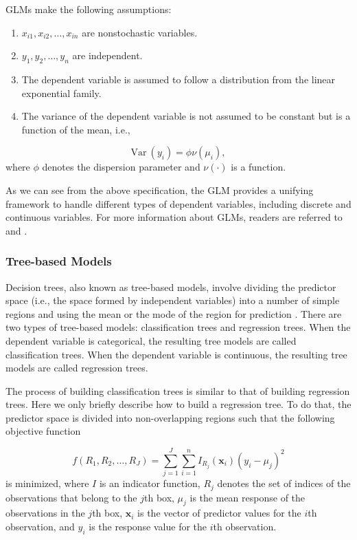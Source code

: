 \documentclass[]{book}
\theoremstyle{definition}
\theoremstyle{definition}
\theoremstyle{definition}
\theoremstyle{remark}
\begin{document}
GLMs make the following assumptions:

\begin{enumerate}
\def\labelenumi{(\alph{enumi})}
\item
  \(x_{i1},x_{i2},\ldots,x_{in}\) are nonstochastic variables.
\item
  \(y_1,y_2,\ldots,y_n\) are independent.
\item
  The dependent variable is assumed to follow a distribution from the
  linear exponential family.
\item
  The variance of the dependent variable is not assumed to be constant
  but is a function of the mean, i.e.,
\end{enumerate}

\[\mathrm{Var~}{(y_i)} = \phi \nu(\mu_i),\] where \(\phi\) denotes the
dispersion parameter and \(\nu(\cdot)\) is a function.

As we can see from the above specification, the GLM provides a unifying
framework to handle different types of dependent variables, including
discrete and continuous variables. For more information about GLMs,
readers are referred to \citep{dejong2008} and \citep{frees2009}.

\subsubsection{Tree-based Models}\label{tree-based-models}

Decision trees, also known as tree-based models, involve dividing the
predictor space (i.e., the space formed by independent variables) into a
number of simple regions and using the mean or the mode of the region
for prediction \citep{breiman1984}. There are two types of tree-based
models: classification trees and regression trees. When the dependent
variable is categorical, the resulting tree models are called
classification trees. When the dependent variable is continuous, the
resulting tree models are called regression trees.

The process of building classification trees is similar to that of
building regression trees. Here we only briefly describe how to build a
regression tree. To do that, the predictor space is divided into
non-overlapping regions such that the following objective function

\[f(R_1,R_2,\ldots,R_J) = \sum_{j=1}^J \sum_{i=1}^n I_{R_j}(\textbf{x}_i)(y_i - \mu_j)^2\]
is minimized, where \(I\) is an indicator function, \(R_j\) denotes the
set of indices of the observations that belong to the \(j\)th box,
\(\mu_j\) is the mean response of the observations in the \(j\)th box,
\(\textbf{x}_i\) is the vector of predictor values for the \(i\)th
observation, and \(y_i\) is the response value for the \(i\)th
observation.
\end{document}
